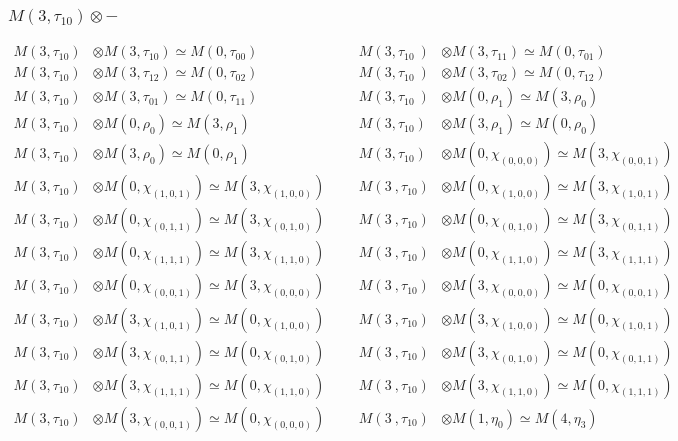 \subsubsection{$M(3,\tau_{10})\otimes -$}
\begin{align*}
M(3,\tau_{10}) &\otimes M(3,\tau_{10}) \simeq M(0,\tau_{00}) &&& M(3,\tau_{10}\
) &\otimes M(3,\tau_{11}) \simeq M(0,\tau_{01})\\
M(3,\tau_{10}) &\otimes M(3,\tau_{12}) \simeq M(0,\tau_{02}) &&& M(3,\tau_{10}\
) &\otimes M(3,\tau_{02}) \simeq M(0,\tau_{12})\\
M(3,\tau_{10}) &\otimes M(3,\tau_{01}) \simeq M(0,\tau_{11}) &&& M(3,\tau_{10}\
) &\otimes M(0,\rho_{1}) \simeq M(3,\rho_{0})\\
M(3,\tau_{10}) &\otimes M(0,\rho_{0}) \simeq M(3,\rho_{1}) &&& M(3,\tau_{10}) \
&\otimes M(3,\rho_{1}) \simeq M(0,\rho_{0})\\
M(3,\tau_{10}) &\otimes M(3,\rho_{0}) \simeq M(0,\rho_{1}) &&& M(3,\tau_{10}) \
&\otimes M(0,\chi_{(0,0,0)}) \simeq M(3,\chi_{(0,0,1)})\\
M(3,\tau_{10}) &\otimes M(0,\chi_{(1,0,1)}) \simeq M(3,\chi_{(1,0,0)}) &&& M(3\
,\tau_{10}) &\otimes M(0,\chi_{(1,0,0)}) \simeq M(3,\chi_{(1,0,1)})\\
M(3,\tau_{10}) &\otimes M(0,\chi_{(0,1,1)}) \simeq M(3,\chi_{(0,1,0)}) &&& M(3\
,\tau_{10}) &\otimes M(0,\chi_{(0,1,0)}) \simeq M(3,\chi_{(0,1,1)})\\
M(3,\tau_{10}) &\otimes M(0,\chi_{(1,1,1)}) \simeq M(3,\chi_{(1,1,0)}) &&& M(3\
,\tau_{10}) &\otimes M(0,\chi_{(1,1,0)}) \simeq M(3,\chi_{(1,1,1)})\\
M(3,\tau_{10}) &\otimes M(0,\chi_{(0,0,1)}) \simeq M(3,\chi_{(0,0,0)}) &&& M(3\
,\tau_{10}) &\otimes M(3,\chi_{(0,0,0)}) \simeq M(0,\chi_{(0,0,1)})\\
M(3,\tau_{10}) &\otimes M(3,\chi_{(1,0,1)}) \simeq M(0,\chi_{(1,0,0)}) &&& M(3\
,\tau_{10}) &\otimes M(3,\chi_{(1,0,0)}) \simeq M(0,\chi_{(1,0,1)})\\
M(3,\tau_{10}) &\otimes M(3,\chi_{(0,1,1)}) \simeq M(0,\chi_{(0,1,0)}) &&& M(3\
,\tau_{10}) &\otimes M(3,\chi_{(0,1,0)}) \simeq M(0,\chi_{(0,1,1)})\\
M(3,\tau_{10}) &\otimes M(3,\chi_{(1,1,1)}) \simeq M(0,\chi_{(1,1,0)}) &&& M(3\
,\tau_{10}) &\otimes M(3,\chi_{(1,1,0)}) \simeq M(0,\chi_{(1,1,1)})\\
M(3,\tau_{10}) &\otimes M(3,\chi_{(0,0,1)}) \simeq M(0,\chi_{(0,0,0)}) &&& M(3\
,\tau_{10}) &\otimes M(1,\eta_{0}) \simeq M(4,\eta_{3})\\

\end{align*}
